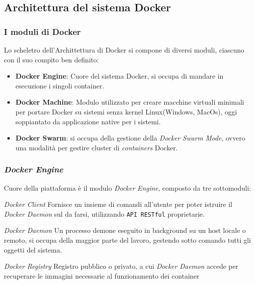 \documentclass{beamer}
\begin{document}
\subsection{Architettura del sistema Docker} %


\begin{frame}
\frametitle{I moduli di Docker}
Lo scheletro dell'Archittettura di Docker si compone di diversi moduli, ciascuno con il suo compito ben definito:
\begin{itemize}
\item \textbf{Docker Engine}: Cuore del sistema Docker, si occupa di mandare in esecuzione i singoli container.
\item  \textbf{Docker Machine}: Modulo utilizzato per creare macchine virtuali minimali per portare Docker su sistemi senza kernel Linux(Windows, MacOs), oggi soppiantato da applicazione native per i sistemi.
\item  \textbf{Docker Swarm}: si occupa della gestione della \textit{Docker Swarm Mode}, ovvero una modalità per gestire cluster di \textit{containers} Docker.
\end{itemize}
\end{frame}

\begin{frame}
\frametitle{ \textit{Docker Engine}}
Cuore della piattaforma è il modulo \textit{Docker Engine}, composto da tre sottomoduli:
\begin{block}{ \textit{Docker Client}}
Fornisce un insieme di comandi all’utente per poter istruire il  \textit{Docker Daemon} sul da farsi, utilizzando \texttt{API RESTful} proprietarie.
\end{block}

\begin{block}{\textit{Docker Daemon}}
Un processo demone eseguito in background su un host locale o remoto, si occupa della maggior parte del lavoro, gestendo sotto comando tutti gli oggetti del sistema.
\end{block}

\begin{block}{\textit{Docker Registry}}
Registro pubblico o privato, a cui \textit{Docker Daemon} accede per recuperare le immagini necessarie al funzionamento dei container
\end{block}
\end{frame}

\end{document}

